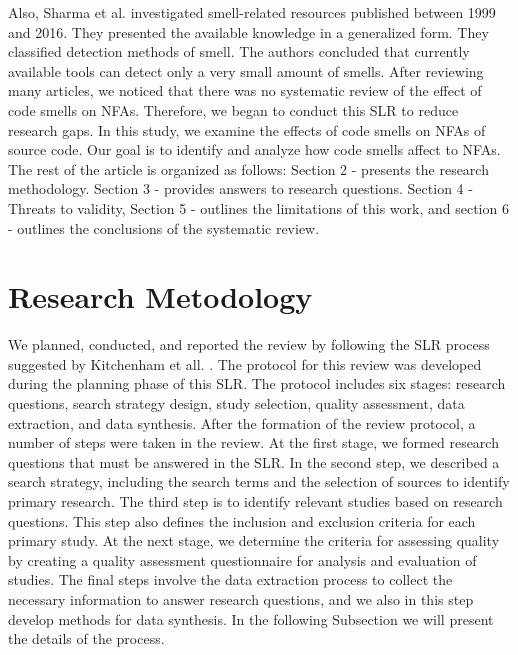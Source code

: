 \documentclass{sigchi}
\begin{document}
Also, Sharma et al. \cite{Sharma} investigated smell-related resources published between 1999 and 2016. They presented the available knowledge in a generalized form. They classified detection methods of smell. The authors concluded that currently available tools can detect only a very small amount of smells.
After reviewing many articles, we noticed that there was no systematic review of the effect of code smells on NFAs. Therefore, we began to conduct this SLR to reduce research gaps. In this study, we examine the effects of code smells on NFAs of source code.  Our goal is to identify and analyze how code smells affect to NFAs.
The rest of the article is organized as follows: Section 2 - presents the research methodology. Section 3 - provides answers to research questions. Section 4 - Threats to validity, Section 5 - outlines the limitations of this work, and section 6 - outlines the conclusions of the systematic review.


\section{Research Metodology}
We planned, conducted, and reported the review by following the SLR process suggested by Kitchenham et all. \cite{Kitchenham}. The protocol for this review was developed during the planning phase of this SLR. The protocol includes six stages: research questions, search strategy design, study selection, quality assessment, data extraction, and data synthesis. After the formation of the review protocol, a number of steps were taken in the review. At the first stage, we formed research questions that must be answered in the SLR. In the second step, we described a search strategy, including the search terms and the selection of sources to identify primary research. The third step is to identify relevant studies based on research questions. This step also defines the inclusion and exclusion criteria for each primary study. At the next stage, we determine the criteria for assessing quality by creating a quality assessment questionnaire for analysis and evaluation of studies. The final steps involve the data extraction process to collect the necessary information to answer research questions, and we also in this step develop methods for data synthesis. In the following Subsection we will present the details of the process. 
\end{document}
